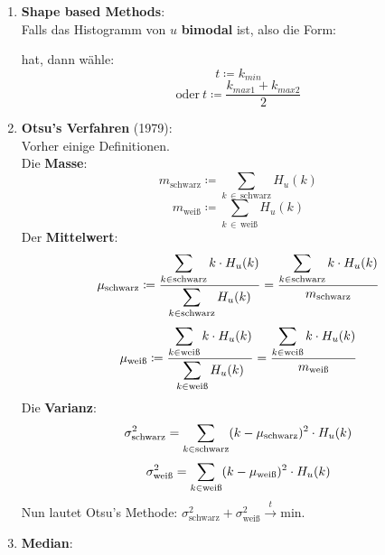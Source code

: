         \begin{enumerate}
            \item \textbf{Shape based Methods}:\\
                Falls das Histogramm von $u$ \textbf{bimodal} ist, also die Form:
            \begin{center}
            \end{center}
            hat, dann wähle:
            \[t \coloneqq k_{min}\]
            \[\text{oder} \ t \coloneqq  \frac{k_{max 1} + k_{max 2}}{2}\]
        \item \textbf{Otsu's Verfahren} (1979):\\
            Vorher einige Definitionen.\\
            Die \textbf{Masse}:
            \[m_{\text{schwarz}}  \coloneqq  \sum_{k \,\in\, \text{schwarz}} H_u(k)\]
            \[m_{\text{weiß}}  \coloneqq  \sum_{k \,\in\, \text{weiß}} H_u(k)\]
            Der \textbf{Mittelwert}:
            \[\mu_{\text{schwarz}}  \coloneqq  \frac{\displaystyle \sum_{k \in \text{schwarz}} k \cdot H_u(k) }{\displaystyle \sum_{k \in \text{schwarz}}H_u(k)} = \frac{\displaystyle \sum_{k \in \text{schwarz}} k \cdot H_u(k) }{m_{\text{schwarz}}}\]
            \[\mu_{\text{weiß}}  \coloneqq  \frac{\displaystyle \sum_{k \in \text{weiß}} k \cdot H_u(k) }{\displaystyle \sum_{k \in \text{weiß}}H_u(k)} = \frac{\displaystyle \sum_{k \in \text{weiß}} k \cdot H_u(k) }{m_{\text{weiß}}}\]
            Die \textbf{Varianz}:
            \[\sigma^2_{\text{schwarz}} = \sum_{k \in \text{schwarz}} (k - \mu_{\text{schwarz}})^2 \cdot H_u(k)\]
            \[\sigma^2_{\text{weiß}} = \sum_{k \in \text{weiß}} (k - \mu_{\text{weiß}})^2 \cdot H_u(k)\]
            Nun lautet Otsu's Methode: $\sigma^2_{\text{schwarz}} + \sigma^2_{\text{weiß}} \overset{t}{\rightarrow} \text{min}$.
        \item \textbf{Median}:\\

\end{enumerate}
